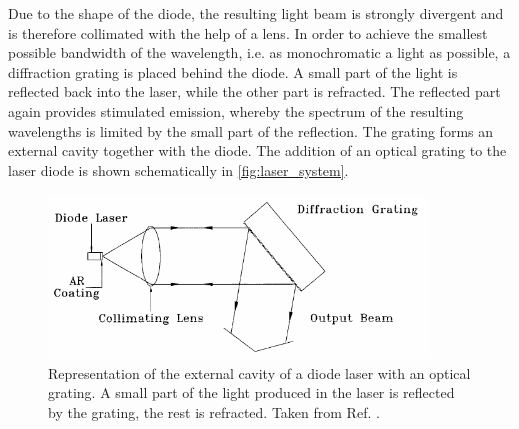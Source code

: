 Due to the shape of the diode, the resulting light beam is strongly divergent and is therefore collimated with the help of a lens.
In order to achieve the smallest possible bandwidth of the wavelength,
i.e. as monochromatic a light as possible,
a diffraction grating is placed behind the diode.
A small part of the light is reflected back into the laser,
while the other part is refracted.
The reflected part again provides stimulated emission,
whereby the spectrum of the resulting wavelengths is limited by the small part of the reflection.
The grating forms an external cavity together with the diode.
The addition of an optical grating to the laser diode is shown schematically in \autoref{fig:laser_system}.
\begin{figure}
    \centering
    \includegraphics[width=0.9\textwidth]{content/img/p8_Fig4.png}
    \caption{Representation of the external cavity of a diode laser with an optical grating.
    A small part of the light produced in the laser is reflected by the grating, the rest is refracted.
    Taken from Ref. \cite{versuchsanleitung}.}
    \label{fig:laser_system}
\end{figure}

